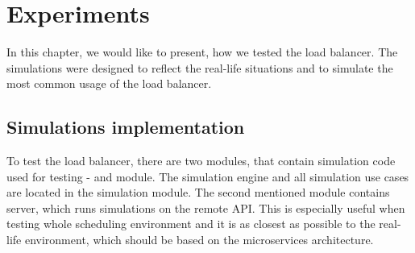 \chapter{Experiments}\label{ch:experiments}

In this chapter, 
we would like to present,
how we tested the load balancer.
The simulations were designed to reflect the real-life situations 
and to simulate the most common usage of the load balancer.


\section{Simulations implementation}\label{sec:simulations-implementations}
To test the load balancer,
there are two modules, 
that contain simulation code used for testing -
 and  module.
The simulation engine and all simulation use cases are located in the simulation module.
The second mentioned module contains server, 
which runs simulations on the remote API. 
This is especially useful when testing whole scheduling environment
and it is as closest as possible to the real-life environment,
which should be based on the microservices architecture.



